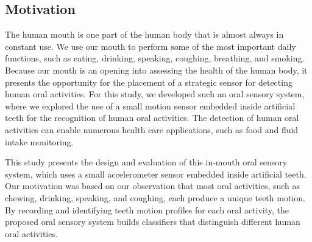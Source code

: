 \subsection{Motivation}
The human mouth is one part of the human body that is almost always in constant use. We use our mouth to perform some of the most important daily functions, such as eating, drinking, speaking, coughing, breathing, and smoking. Because our mouth is an opening into assessing the health of the human body, it presents the opportunity for the placement of a strategic sensor for detecting human oral activities. For this study, we developed such an oral sensory system, where we explored the use of a small motion sensor embedded inside artificial teeth for the recognition of human oral activities. The detection of human oral activities can enable numerous health care applications, such as food and fluid intake monitoring.   


This study presents the design and evaluation of this in-mouth oral sensory system, which uses a small accelerometer sensor embedded inside artificial teeth. Our motivation was based on our observation that most oral activities, such as chewing, drinking, speaking, and coughing, each produce a unique teeth motion. By recording and identifying teeth motion profiles for each oral activity, the proposed oral sensory system builds classifiers that distinguish different human oral activities. 

